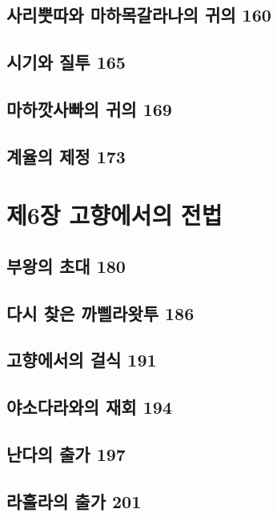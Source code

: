 \documentclass[12pt, a4paper, oneside]{book}
\let\stdsection\section
\renewcommand\section{\newpage\stdsection}
\begin{document}
	\section{사리뿟따와 마하목갈라나의 귀의 160 }

	\section{시기와 질투 165 }

	\section{마하깟사빠의 귀의 169 }

	\section{계율의 제정 173}





	\chapter{제6장 고향에서의 전법}
	\noptcrule
	\parttoc				

	\section{부왕의 초대 180 }

	\section{다시 찾은 까삘라왓투 186 }

	\section{고향에서의 걸식 191 }

	\section{야소다라와의 재회 194 }

	\section{난다의 출가 197 }

	\section{라훌라의 출가 201 }
\end{document}
